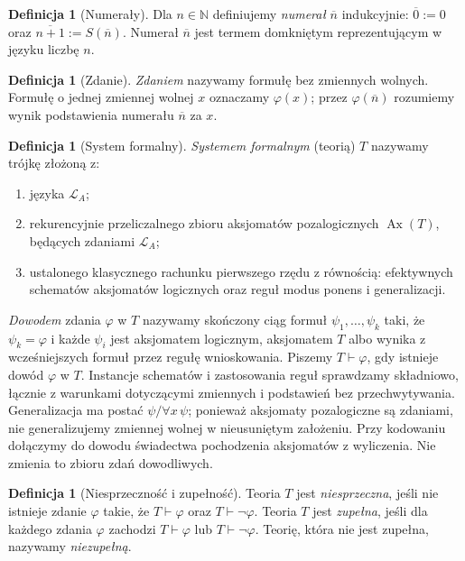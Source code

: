 \documentclass[11pt,a4paper]{article}
\numberwithin{equation}{section}
\theoremstyle{plain}
\theoremstyle{definition}
\newtheorem{definicja}[twierdzenie]{Definicja}
\theoremstyle{remark}
\begin{document}
\begin{definicja}[Numerały]\label{res:3:2}
Dla $n\in\mathbb N$ definiujemy \emph{numerał} $\overline n$ indukcyjnie: $\overline0:=0$ oraz $\overline{n+1}:=S(\overline n)$. Numerał $\overline n$ jest termem domkniętym reprezentującym w języku liczbę $n$.
\end{definicja}

\begin{definicja}[Zdanie]\label{res:3:3}
\emph{Zdaniem} nazywamy formułę bez zmiennych wolnych. Formułę o jednej zmiennej wolnej $x$ oznaczamy $\varphi(x)$; przez $\varphi(\overline n)$ rozumiemy wynik podstawienia numerału $\overline n$ za $x$.
\end{definicja}

\begin{definicja}[System formalny]\label{res:3:4}
\emph{Systemem formalnym} (teorią) $T$ nazywamy trójkę złożoną z:
\begin{enumerate}[label=(\alph*)]
\item języka $\mathcal L_A$;
\item rekurencyjnie przeliczalnego zbioru aksjomatów pozalogicznych $\operatorname{Ax}(T)$, będących zdaniami $\mathcal L_A$;
\item ustalonego klasycznego rachunku pierwszego rzędu z równością: efektywnych schematów aksjomatów logicznych oraz reguł modus ponens i generalizacji.
\end{enumerate}
\emph{Dowodem} zdania $\varphi$ w $T$ nazywamy skończony ciąg formuł $\psi_1,\ldots,\psi_k$ taki, że $\psi_k=\varphi$ i każde $\psi_i$ jest aksjomatem logicznym, aksjomatem $T$ albo wynika z wcześniejszych formuł przez regułę wnioskowania. Piszemy $T\vdash\varphi$, gdy istnieje dowód $\varphi$ w $T$. Instancje schematów i zastosowania reguł sprawdzamy składniowo, łącznie z warunkami dotyczącymi zmiennych i podstawień bez przechwytywania. Generalizacja ma postać $\psi/\forall x\,\psi$; ponieważ aksjomaty pozalogiczne są zdaniami, nie generalizujemy zmiennej wolnej w nieusuniętym założeniu. Przy kodowaniu dołączymy do dowodu świadectwa pochodzenia aksjomatów z wyliczenia. Nie zmienia to zbioru zdań dowodliwych.
\end{definicja}

\begin{definicja}[Niesprzeczność i zupełność]\label{res:3:5}
Teoria $T$ jest \emph{niesprzeczna}, jeśli nie istnieje zdanie $\varphi$ takie, że $T\vdash\varphi$ oraz $T\vdash\neg\varphi$. Teoria $T$ jest \emph{zupełna}, jeśli dla każdego zdania $\varphi$ zachodzi $T\vdash\varphi$ lub $T\vdash\neg\varphi$. Teorię, która nie jest zupełna, nazywamy \emph{niezupełną}.
\end{definicja}
\end{document}
